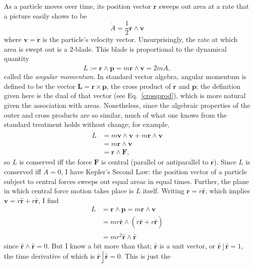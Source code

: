 \documentclass{utarticle}
\DeclareMathOperator{\lin}{\rfloor}
\DeclareMathOperator{\out}{\wedge}
\newcommand{\half}{\ensuremath{\frac{1}{2}}}
\begin{document}
As a particle moves over time, its position vector $\bm{r}$ sweeps out area
at a rate that a picture easily shows to be
\begin{equation} \dot{A} = \half \bm{r} \out \bm{v} \end{equation}
where $\bm{v} = \dot{\bm{r}}$ is the particle's velocity vector.  
Unsurprisingly, the rate at which area is swept out is a $2$-blade.  
This blade is proportional to the dynamical quantity
\begin{equation} 
L := \bm{r} \out \bm{p} = m \bm{r} \out \bm{v} = 2 m \dot{A}, 
\end{equation}
called the \emph{angular momentum}.  In standard vector algebra, angular 
momentum is defined to be the vector $\bm{L} = \bm{r} \times \bm{p}$, the
cross product of $\bm{r}$ and $\bm{p}$; the definition given here is the
dual of that vector (see Eq.~\eqref{crossprod}), which is more natural given
the association with areas.  Nonetheless, since the algebraic properties of the
outer and cross products are so similar, much of what one knows from the 
standard treatment holds without change; for example,
\begin{align}
\dot{L} & = m \bm{v} \out \bm{v} + m \bm{r} \out \dot{\bm{v}} \nonumber \\
        & = m \bm{r} \out \dot{\bm{v}} \nonumber \\
        & = \bm{r} \out \bm{F},
\end{align}
so $L$ is conserved iff the force $\bm{F}$ is central (parallel or antiparallel 
to $\bm{r}$).  Since $L$ is conserved iff $\dot{A}=0$, I have Kepler's Second 
Law: the position vector of a particle subject to central forces sweeps out 
equal areas in equal times.  Further, the plane in which central force motion 
takes place is $L$ itself.  Writing $\bm{r} = r \bm{\hat{r}}$, which implies $\bm{v} 
= \dot{r} \bm{\hat{r}} + r \dot{\bm{\hat{r}}}$, I find
\begin{align}
L & = \bm{r} \out \bm{p} = m \bm{r} \out \bm{v} \nonumber \\
  & = m r \bm{\hat{r}} \out ( \dot{r} \bm{\hat{r}} + 
                                r \dot{\bm{\hat{r}}} ) \nonumber \\
  & = m r^2 \bm{\hat{r}} \out \dot{\bm{\hat{r}}}
\end{align}
since $\bm{\hat{r}} \out \bm{\hat{r}} = 0$.  But I know a bit more than that; 
$\bm{\hat{r}}$ is a unit vector, or $\bm{\hat{r}} \lin \bm{\hat{r}} = 1$, the time 
derivative of which is $\bm{\hat{r}} \lin \dot{\bm{\hat{r}}} = 0$. This is just the 
\end{document}
